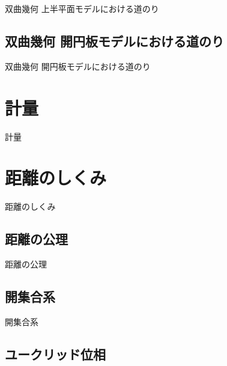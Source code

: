 双曲幾何 上半平面モデルにおける道のり

\newpage


\subsection{双曲幾何 開円板モデルにおける道のり}

双曲幾何 開円板モデルにおける道のり

\newpage


\section{計量}

計量

\newpage


\section{距離のしくみ}

距離のしくみ

\newpage


\subsection{距離の公理}

距離の公理

\newpage


\subsection{開集合系}

開集合系

\newpage


\subsection{ユークリッド位相}

